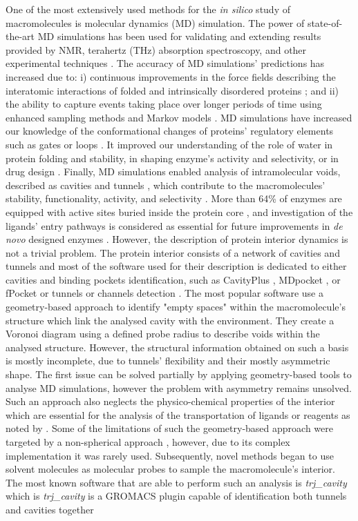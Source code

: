\documentclass[9pt,tutorial]{livecoms}
\begin{document}
One of the most extensively used methods for the \textit{in silico} study of macromolecules is  molecular dynamics (MD) simulation. The power of state-of-the-art MD simulations has been used for validating and extending results provided by NMR, terahertz (THz) absorption spectroscopy, and other experimental techniques \cite{Bottaro2018}. The accuracy of MD simulations’ predictions has increased due to:  i) continuous improvements in the force fields describing the interatomic interactions of folded and intrinsically disordered proteins \cite{Huang2017}; and ii) the ability to capture events taking place over longer periods of time using enhanced sampling methods \cite{Bernardi2015} and Markov models \cite{Husic2018}. MD simulations have increased our knowledge of the conformational changes of proteins’ regulatory elements such as gates \cite{Gora2013} or loops \cite{Kress2018}. It improved our understanding of the role of water in protein folding and stability, in shaping enzyme’s activity and selectivity, or in drug design \cite{Mondal2017,Spyrakis2017}. Finally, MD simulations enabled analysis of intramolecular voids, described as cavities \cite{Stank2016} and tunnels \cite{Kingsley2015,Marques2016}, which contribute to the macromolecules’ stability, functionality, activity, and selectivity \cite{Kokkonen2019}. More than 64\% of enzymes are equipped with active sites buried inside the protein core \cite{Pravda2014}, and investigation of the ligands’ entry pathways is considered as essential for future improvements in \textit{de novo} designed enzymes \cite{Huang2016}. However, the description of protein interior dynamics is not a trivial problem. The protein interior consists of a network of cavities and tunnels and most of the software used for their description is dedicated to either cavities and binding pockets identification, such as CavityPlus \cite{Xu2018}, MDpocket \cite{Schmidtke2011}, or fPocket \cite{Guilloux2009} or tunnels or channels detection \cite{Brezovsky2013}. The most popular software use a geometry-based approach to identify "empty spaces" within the macromolecule's structure which link the analysed cavity with the environment. They create a Voronoi diagram using a defined probe radius to describe voids within the analysed structure. However, the structural information obtained on such a basis is mostly incomplete, due to tunnels’ flexibility and their mostly asymmetric shape. The first issue can be solved partially by applying geometry-based tools to analyse MD simulations, however the problem with asymmetry remains unsolved. Such an approach also neglects the physico-chemical properties of the interior which are essential for the analysis of the transportation of ligands or reagents as noted by \cite{Kaushik2018}. Some of the limitations of such the geometry-based approach were targeted by a non-spherical approach \cite{Benkaidali2014}, however, due to its complex implementation it was rarely used. Subsequently, novel methods began to use solvent molecules as molecular probes \cite{Mitusinska2020} to sample the macromolecule's interior. The most known software that are able to perform such an analysis is \textit{trj\_cavity} \cite{Paramo2014} which is \textit{trj\_cavity} is a GROMACS plugin capable of identification both tunnels and cavities together 
\end{document}
